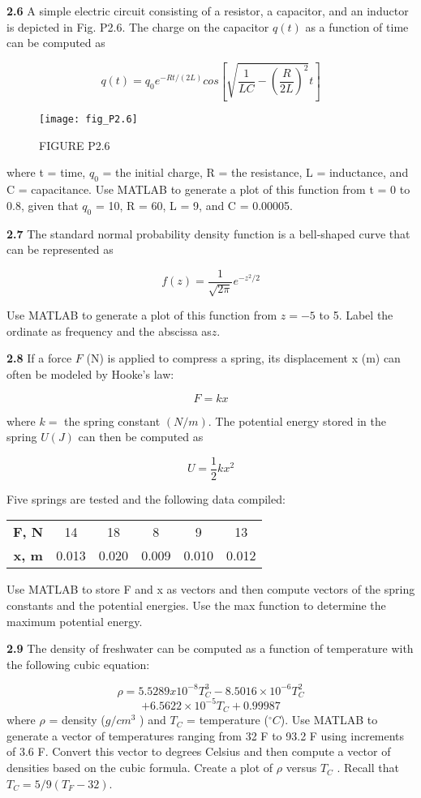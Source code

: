 \documentclass[../main.tex]{subfiles}
\begin{document}
\begin{multicols}{2}
\textbf{2.6} A simple electric circuit consisting of a resistor, a capacitor, and an inductor is depicted in Fig. P2.6. The charge
on the capacitor $q(t)$ as a function of time can be computed
as

$$q(t)=q_0e^{-Rt/(2L)}cos \left[\sqrt{ \dfrac{1}{LC}-\left(\dfrac{R}{2L} \right)^2 }t\right]$$


\begin{figure}[H]
	\centering
	\texttt{[image: fig\_P2.6]}
   \caption*{\textsf{FIGURE P2.6}}
   \label{fig_P2.6}
\end{figure}

where t = time, $q_0$ = the initial charge, R = the resistance,
L = inductance, and C = capacitance. Use MATLAB to
generate a plot of this function from t = 0 to 0.8, given that
$q_0$ = 10, R = 60, L = 9, and C = 0.00005.


\textbf{2.7} The standard normal probability density function is a
bell-shaped curve that can be represented as

$$f(z)=\dfrac{1}{\sqrt{2\pi}}e^{-z^2/2} $$

Use MATLAB to generate a plot of this function from
$z = -5$ to 5. Label the ordinate as frequency and the abscissa as$ z$.


\textbf{2.8} If a force $F$ (N) is applied to compress a spring, its displacement x (m) can often be modeled by Hooke's law:

$$F=kx $$


where $k =$ the spring constant $(N/m)$. The potential energy
stored in the spring $U (J)$ can then be computed as


$$U=\dfrac{1}{2}kx^2 $$

Five springs are tested and the following data compiled:

\begin{tabular}{cccccc}
	\hline
	\textbf{F, N} &14 &18& 8 &9& 13\\
	\textbf{x, m}& 0.013 &0.020& 0.009& 0.010& 0.012\\
	\hline
	
\end{tabular}
Use MATLAB to store F and x as vectors and then compute
vectors of the spring constants and the potential energies.
Use the max function to determine the maximum potential
energy.


\textbf{2.9} The density of freshwater can be computed as a function
of temperature with the following cubic equation:


$$ \rho =5.5289x10^{-8}T_C^3-8.5016 \times 10^{-6}T_C^2 $$
$$+6.5622 \times 10^{-5}T_C+0.99987$$
where $\rho$ = density ($g/cm^3$
) and $T_C$ = temperature ($^{\circ} C$). Use
MATLAB to generate a vector of temperatures ranging from
32 F to 93.2 F using increments of 3.6 F. Convert this vector to degrees Celsius and then compute a vector of densities
based on the cubic formula. Create a plot of $\rho$ versus $T_C$ .
Recall that $T_C = 5/9(T_F - 32)$.



\end{multicols}
\end{document}
